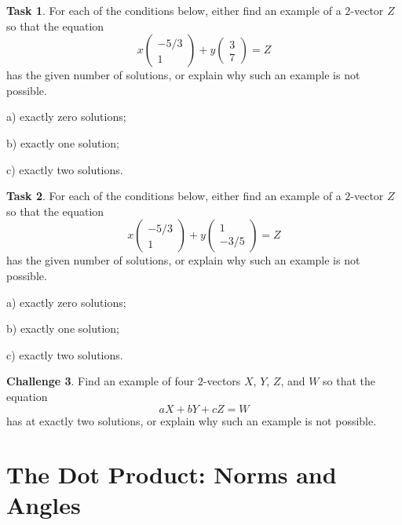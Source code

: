 \documentclass{tufte-book}
\theoremstyle{definition}
\newtheorem{task}{Task}
\newtheorem{challenge}[task]{Challenge}
\begin{document}
\begin{task}
For each of the conditions below, either find an example of a $2$-vector $Z$ so that the equation
\[
x\begin{pmatrix}-5/3\\1\end{pmatrix} + y\begin{pmatrix}3\\7 \end{pmatrix} = Z
\]
has the given number of solutions, or explain why such an example is not possible.
\begin{compactitem}
\item[a)] exactly zero solutions;
\item[b)] exactly one solution; 
\item[c)] exactly two solutions.
\end{compactitem}
\end{task}

\begin{task}
For each of the conditions below, either find an example of a $2$-vector $Z$ so that the equation
\[
x\begin{pmatrix}-5/3\\1\end{pmatrix} + y\begin{pmatrix}1\\-3/5 \end{pmatrix} = Z
\]
has the given number of solutions, or explain why such an example is not possible.
\begin{compactitem}
\item[a)] exactly zero solutions;
\item[b)] exactly one solution; 
\item[c)] exactly two solutions.
\end{compactitem}
\end{task}

\begin{challenge}
Find an example of four $2$-vectors $X$, $Y$, $Z$, and $W$ so that the equation
\[
aX+bY+cZ = W
\]
has at exactly two solutions, or explain why such an example is not possible.
\end{challenge}

\section*{The Dot Product: Norms and Angles}
\end{document}

